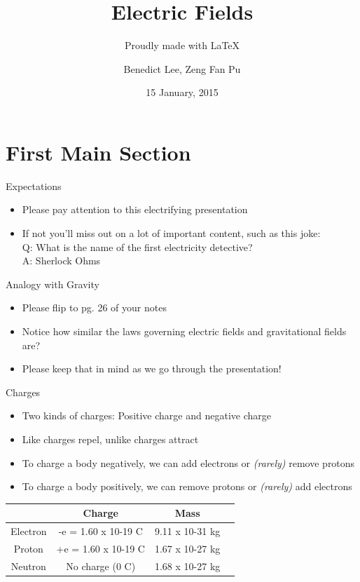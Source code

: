 \documentclass{beamer}
\title{Electric Fields}
\subtitle{Proudly made with \LaTeX}
\author{Benedict Lee, Zeng Fan Pu}
\institute[Hwa Chong Institution] %
\date{15 January, 2015}
\begin{document}
\begin{frame}
  \titlepage
\end{frame}

\section{First Main Section}

\begin{frame}{Expectations}{}
  \begin{itemize}
  \item Please pay attention to this electrifying presentation
  \item If not you'll miss out on a lot of important content, such as this	 joke:\\Q: What is the name of the first electricity detective?\\A: Sherlock Ohms 
  \end{itemize}
\end{frame}

\begin{frame}{Analogy with Gravity}{}
  \begin{itemize}
  \item Please flip to pg. 26 of your notes
  \item Notice how similar the laws governing electric fields and gravitational fields are?
  \item Please keep that in mind as we go through the presentation!
  \end{itemize}
\end{frame}

\begin{frame}{Charges}{}
  \begin{itemize}
  \item Two kinds of charges: Positive charge and negative charge
  \item Like charges repel, unlike charges attract 
  \item To charge a body negatively, we can add electrons or \textit{(rarely)} remove protons
  \item To charge a body positively, we can remove protons or \textit{(rarely)} add electrons
  \end{itemize}
  \begin{center}

    \label{table:second}
    \setlength{\tabcolsep}{2pt}
    \small
    \begin{tabular}{|c|c|c|c|} \hline
       & Charge & Mass \\ \hline
       Electron & -e  = 1.60 x 10-19 C & 9.11 x 10-31 kg \\ \hline
       Proton & +e = 1.60 x 10-19 C & 1.67 x 10-27 kg \\ \hline
       Neutron & No charge (0 C) & 1.68 x 10-27 kg \\ \hline
    \end{tabular}
  \end{center}%
\end{frame}
\end{document}

